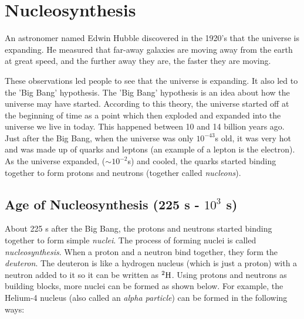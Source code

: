 



\section{Nucleosynthesis}
An astronomer named Edwin Hubble discovered in the 1920's that the universe is expanding. He measured that far-away galaxies are moving away from the earth at great speed, and the further away they are, the faster they are moving.


These observations led people to see that the universe is expanding. It also led to the 'Big Bang' hypothesis. The 'Big Bang' hypothesis is an idea about how the universe may have started. According to this theory, the universe started off at the beginning of time as a point which then exploded and expanded into the universe we live in today. This happened between 10 and 14 billion years ago.\\

Just after the Big Bang, when the universe was only $10^{-43}$s old, it was very hot and was made up of quarks and leptons (an example of a lepton is the electron). As the universe expanded, ($\sim10^{-2}$s) and cooled, the quarks started binding together to form protons and neutrons (together called \emph{nucleons}).

\subsection{Age of Nucleosynthesis (225 s - $10^{3}$ s)}
About 225 s after the Big Bang, the protons and neutrons started binding together to form simple \emph{nuclei}. The process of forming nuclei is called \emph{nucleosynthesis}. When a proton and a neutron bind together, they form the \emph{deuteron}. The deuteron is like a hydrogen nucleus (which is just a proton) with a neutron added to it so it can be written as $^{2}\rm{H}$. Using protons and neutrons as building blocks, more nuclei can be formed as shown below. For example, the Helium-4 nucleus (also called an \emph{alpha particle}) can be formed in the following ways:

